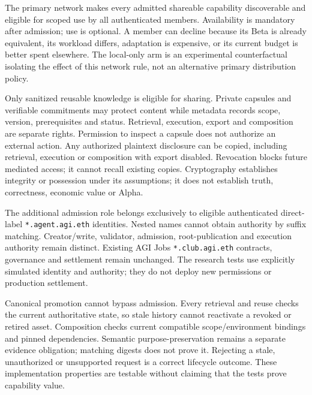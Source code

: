 \documentclass[11pt,a4paper]{article}
\begin{document}
The primary network makes every admitted shareable capability discoverable and eligible for scoped use by all authenticated members. Availability is mandatory after admission; use is optional. A member can decline because its Beta is already equivalent, its workload differs, adaptation is expensive, or its current budget is better spent elsewhere. The local-only arm is an experimental counterfactual isolating the effect of this network rule, not an alternative primary distribution policy.

Only sanitized reusable knowledge is eligible for sharing. Private capsules and verifiable commitments may protect content while metadata records scope, version, prerequisites and status. Retrieval, execution, export and composition are separate rights. Permission to inspect a capsule does not authorize an external action. Any authorized plaintext disclosure can be copied, including retrieval, execution or composition with export disabled. Revocation blocks future mediated access; it cannot recall existing copies. Cryptography establishes integrity or possession under its assumptions; it does not establish truth, correctness, economic value or Alpha.

The additional admission role belongs exclusively to eligible authenticated direct-label \texttt{*.agent.agi.eth} identities. Nested names cannot obtain authority by suffix matching. Creator/write, validator, admission, root-publication and execution authority remain distinct. Existing AGI Jobs \texttt{*.club.agi.eth} contracts, governance and settlement remain unchanged. The research tests use explicitly simulated identity and authority; they do not deploy new permissions or production settlement.

Canonical promotion cannot bypass admission. Every retrieval and reuse checks the current authoritative state, so stale history cannot reactivate a revoked or retired asset. Composition checks current compatible scope/environment bindings and pinned dependencies. Semantic purpose-preservation remains a separate evidence obligation; matching digests does not prove it. Rejecting a stale, unauthorized or unsupported request is a correct lifecycle outcome. These implementation properties are testable without claiming that the tests prove capability value.
\end{document}
